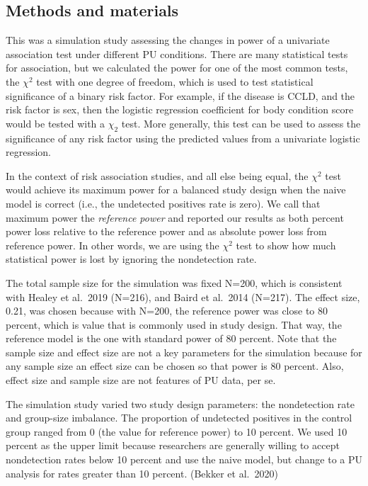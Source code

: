 \documentclass[
]{article}
\begin{document}
\pagebreak

\hypertarget{methods-and-materials}{%
\subsection{Methods and materials}\label{methods-and-materials}}

This was a simulation study assessing the changes in power of a
univariate association test under different PU conditions. There are
many statistical tests for association, but we calculated the power for
one of the most common tests, the \(\chi^2\) test with one degree of
freedom, which is used to test statistical significance of a binary risk
factor. For example, if the disease is CCLD, and the risk factor is sex,
then the logistic regression coefficient for body condition score would
be tested with a \(\chi_2\) test. More generally, this test can be used
to assess the significance of any risk factor using the predicted values
from a univariate logistic regression.

In the context of risk association studies, and all else being equal,
the \(\chi^2\) test would achieve its maximum power for a balanced study
design when the naive model is correct (i.e., the undetected positives
rate is zero). We call that maximum power the \emph{reference power} and
reported our results as both percent power loss relative to the
reference power and as absolute power loss from reference power. In
other words, we are using the \(\chi^2\) test to show how much
statistical power is lost by ignoring the nondetection rate.

The total sample size for the simulation was fixed N=200, which is
consistent with Healey et al.~2019 (N=216), and Baird et al.~2014
(N=217). The effect size, 0.21, was chosen because with N=200, the
reference power was close to 80 percent, which is value that is commonly
used in study design. That way, the reference model is the one with
standard power of 80 percent. Note that the sample size and effect size
are not a key parameters for the simulation because for any sample size
an effect size can be chosen so that power is 80 percent. Also, effect
size and sample size are not features of PU data, per se.

The simulation study varied two study design parameters: the
nondetection rate and group-size imbalance. The proportion of undetected
positives in the control group ranged from 0 (the value for reference
power) to 10 percent. We used 10 percent as the upper limit because
researchers are generally willing to accept nondetection rates below 10
percent and use the naive model, but change to a PU analysis for rates
greater than 10 percent. (Bekker et al.~2020)
\end{document}
